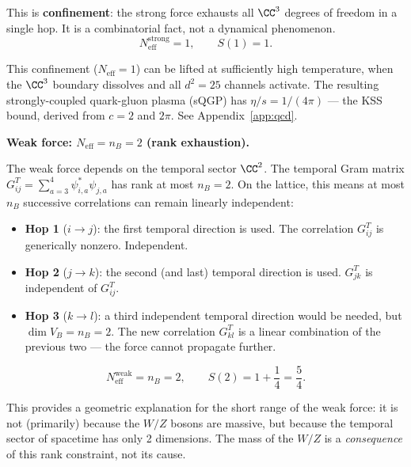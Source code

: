 This is \textbf{confinement}: the strong force exhausts all $\CC^3$ degrees of freedom in a single hop. It is a combinatorial fact, not a dynamical phenomenon.
\begin{equation}
N_\text{eff}^\text{strong} = 1, \qquad S(1) = 1.
\end{equation}

\begin{remark}
This confinement ($N_\text{eff} = 1$) can be lifted at sufficiently high temperature, when the $\CC^3$ boundary dissolves and all $d^2 = 25$ channels activate. The resulting strongly-coupled quark-gluon plasma (sQGP) has $\eta/s = 1/(4\pi)$ --- the KSS bound, derived from $c = 2$ and $2\pi$. See Appendix~\ref{app:qcd}.
\end{remark}

\bigskip

\noindent\textbf{Weak force: $N_\text{eff} = n_B = 2$ (rank exhaustion).}

The weak force depends on the temporal sector $\CC^2$. The temporal Gram matrix $G^T_{ij} = \sum_{a=3}^{4}\psi^*_{i,a}\psi_{j,a}$ has rank at most $n_B = 2$. On the lattice, this means at most $n_B$ successive correlations can remain linearly independent:

\begin{itemize}
\item \textbf{Hop 1} ($i \to j$): the first temporal direction is used. The correlation $G^T_{ij}$ is generically nonzero. Independent.
\item \textbf{Hop 2} ($j \to k$): the second (and last) temporal direction is used. $G^T_{jk}$ is independent of $G^T_{ij}$.
\item \textbf{Hop 3} ($k \to l$): a third independent temporal direction would be needed, but $\dim V_B = n_B = 2$. The new correlation $G^T_{kl}$ is a linear combination of the previous two --- the force cannot propagate further.
\end{itemize}

\begin{equation}
N_\text{eff}^\text{weak} = n_B = 2, \qquad S(2) = 1 + \frac{1}{4} = \frac{5}{4}.
\end{equation}

\begin{remark}
This provides a geometric explanation for the short range of the weak force: it is not (primarily) because the $W/Z$ bosons are massive, but because the temporal sector of spacetime has only 2 dimensions. The mass of the $W/Z$ is a \emph{consequence} of this rank constraint, not its cause.
\end{remark}

